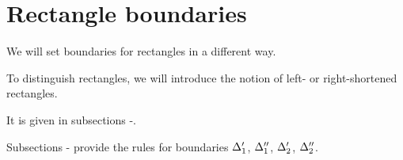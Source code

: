 \section{Rectangle boundaries}
\label{sc:boundaries}


We will set boundaries for rectangles in a different way.

To distinguish rectangles, we will introduce the notion of left- or right-shortened rectangles.

It is given in subsections -.

Subsections -
provide the rules for boundaries $\Delta_1'$, $\Delta_1''$, $\Delta_2'$, $\Delta_2''$.






